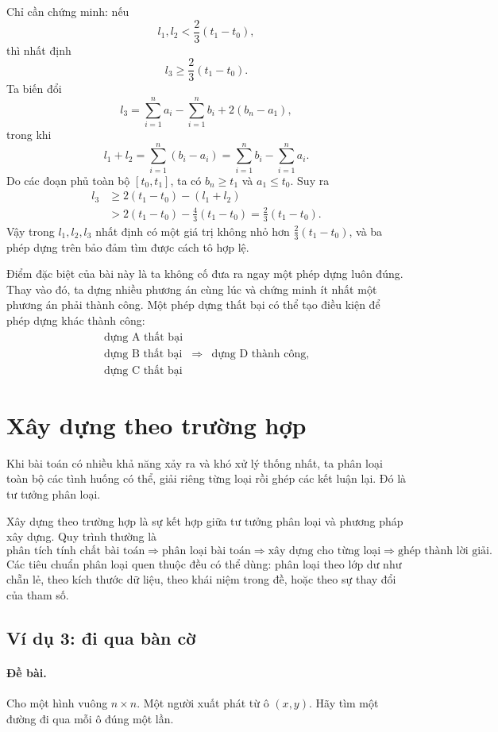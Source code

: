 \documentclass[11pt]{article}
\begin{document}
Chỉ cần chứng minh: nếu
\[
  l_1,l_2<\frac{2}{3}(t_1-t_0),
\]
thì nhất định
\[
  l_3\ge \frac{2}{3}(t_1-t_0).
\]
Ta biến đổi
\[
  l_3=\sum_{i=1}^{n}a_i-\sum_{i=1}^{n}b_i+2(b_n-a_1),
\]
trong khi
\[
  l_1+l_2=\sum_{i=1}^{n}(b_i-a_i)
          =\sum_{i=1}^{n}b_i-\sum_{i=1}^{n}a_i.
\]
Do các đoạn phủ toàn bộ $[t_0,t_1]$, ta có $b_n\ge t_1$ và $a_1\le t_0$.
Suy ra
\[
\begin{aligned}
  l_3
  &\ge 2(t_1-t_0)-(l_1+l_2)\\
  &>2(t_1-t_0)-\frac{4}{3}(t_1-t_0)
   =\frac{2}{3}(t_1-t_0).
\end{aligned}
\]
Vậy trong $l_1,l_2,l_3$ nhất định có một giá trị không nhỏ hơn
$\frac{2}{3}(t_1-t_0)$, và ba phép dựng trên bảo đảm tìm được cách tô hợp lệ.

Điểm đặc biệt của bài này là ta không cố đưa ra ngay một phép dựng luôn đúng.
Thay vào đó, ta dựng nhiều phương án cùng lúc và chứng minh ít nhất một phương
án phải thành công. Một phép dựng thất bại có thể tạo điều kiện để phép dựng
khác thành công:
\[
\begin{array}{rcl}
\text{dựng A thất bại}\\
\text{dựng B thất bại} & \Longrightarrow & \text{dựng D thành công},\\
\text{dựng C thất bại}
\end{array}
\]

\section{Xây dựng theo trường hợp}

Khi bài toán có nhiều khả năng xảy ra và khó xử lý thống nhất, ta phân loại
toàn bộ các tình huống có thể, giải riêng từng loại rồi ghép các kết luận lại.
Đó là tư tưởng phân loại.

Xây dựng theo trường hợp là sự kết hợp giữa tư tưởng phân loại và phương pháp
xây dựng. Quy trình thường là
\[
\text{phân tích tính chất bài toán}
\Longrightarrow
\text{phân loại bài toán}
\Longrightarrow
\text{xây dựng cho từng loại}
\Longrightarrow
\text{ghép thành lời giải}.
\]
Các tiêu chuẩn phân loại quen thuộc đều có thể dùng: phân loại theo lớp dư
như chẵn lẻ, theo kích thước dữ liệu, theo khái niệm trong đề, hoặc theo sự
thay đổi của tham số.

\subsection{Ví dụ 3: đi qua bàn cờ}

\paragraph{Đề bài.}
Cho một hình vuông $n\times n$. Một người xuất phát từ ô $(x,y)$. Hãy tìm một
đường đi qua mỗi ô đúng một lần.
\end{document}
